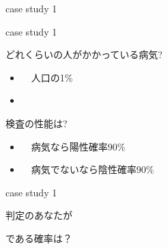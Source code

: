 \documentclass[
  ignorenonframetext,
]{beamer}
\begin{document}
\begin{frame}{}
\protect\hypertarget{section}{}
\Huge

\scalebox{1.4}{\textcolor{softblue}{事例1}}
\end{frame}

\begin{frame}{case study 1}
\protect\hypertarget{case-study-1}{}
\Huge
\centering


\vspace*{-58pt}
\pause
{}
\end{frame}

\begin{frame}{case study 1}
\protect\hypertarget{case-study-1-1}{}
\LARGE

どれくらいの人がかかっている病気? \pause

\begin{itemize}
  \item 　\textbullet{}\hspace{2pt}人口の1\%
  \item 
  \end{itemize}
\pause

検査の性能は? \pause

\begin{itemize}
  \item 　\textbullet{}\hspace{2pt}病気なら陽性確率90\%
  \pause
  \item 　\textbullet{}\hspace{2pt}病気でないなら陰性確率90\%
  \end{itemize}
\end{frame}

\begin{frame}{case study 1}
\protect\hypertarget{case-study-1-2}{}
\Huge
\raggedleft

判定のあなたが

\par
\vspace*{-20pt}\pause
\scalebox{1}{\textcolor{red!60}{ほんとうに}}\par
\pause

\scalebox{1.4}{\textcolor{red!60}{病気}}である確率は？
\end{frame}
\end{document}
